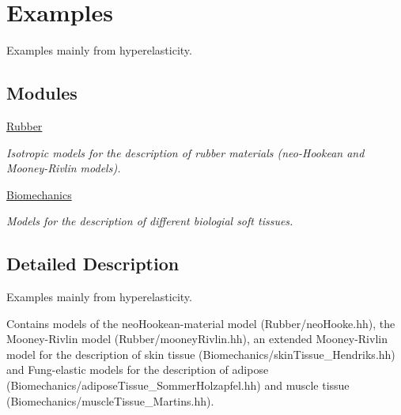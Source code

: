\hypertarget{group__Examples}{}\section{Examples}
\label{group__Examples}


Examples mainly from hyperelasticity.  


\subsection*{Modules}
\begin{DoxyCompactItemize}
\item 
\hyperlink{group__Rubber}{Rubber}
\begin{DoxyCompactList}\small\item\em Isotropic models for the description of rubber materials (neo-\/\+Hookean and Mooney-\/\+Rivlin models). \end{DoxyCompactList}\item 
\hyperlink{group__Biomechanics}{Biomechanics}
\begin{DoxyCompactList}\small\item\em Models for the description of different biologial soft tissues. \end{DoxyCompactList}\end{DoxyCompactItemize}


\subsection{Detailed Description}
Examples mainly from hyperelasticity. 

Contains models of the neo\+Hookean-\/material model (Rubber/neo\+Hooke.\+hh), the Mooney-\/\+Rivlin model (Rubber/mooney\+Rivlin.\+hh), an extended Mooney-\/\+Rivlin model for the description of skin tissue (Biomechanics/skin\+Tissue\+\_\+\+Hendriks.\+hh) and Fung-\/elastic models for the description of adipose (Biomechanics/adipose\+Tissue\+\_\+\+Sommer\+Holzapfel.\+hh) and muscle tissue (Biomechanics/muscle\+Tissue\+\_\+\+Martins.\+hh). 